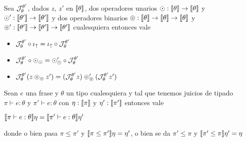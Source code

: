 \begin{proposition}
Sea $\mathcal{J}_{\theta}^{\theta'}$, dados $z$, $z'$ en $\llbracket \theta \rrbracket$, dos operadores
unarios $\odot : \llbracket \theta \rrbracket \rightarrow \llbracket \theta \rrbracket$ y 
$\odot' : \llbracket \theta' \rrbracket \rightarrow \llbracket \theta' \rrbracket$ y dos operadores
binarios $\circledcirc : \llbracket \theta \rrbracket \rightarrow 
		\llbracket \theta \rrbracket \rightarrow \llbracket \theta \rrbracket$ y
$\circledcirc' : \llbracket \theta' \rrbracket \rightarrow 
		\llbracket \theta' \rrbracket \rightarrow \llbracket \theta' \rrbracket$
cualesquiera entonces vale

\begin{itemize}
\item $\mathcal{J}_{\theta}^{\theta'} \circ \iota_{\uparrow} = \iota_{\uparrow} \circ \mathcal{J}_{\theta}^{\theta'}$
\item $\mathcal{J}_{\theta}^{\theta'} \circ \odot_{\odot} = \odot'_{\odot} \circ \mathcal{J}_{\theta}^{\theta'}$
\item $\mathcal{J}_{\theta}^{\theta'} (z \circledcirc_{\circledcirc} z')= 
			(\mathcal{J}_{\theta}^{\theta'} z) \circledcirc'_{\circledcirc} (\mathcal{J}_{\theta}^{\theta'} z')$

\end{itemize}

\end{proposition}

\newpage

\begin{lemma}
Sean $e$ una frase y $\theta$ un tipo cualesquiera y tal que tenemos 
juicios de tipado $\pi \vdash e : \theta$ y $\pi' \vdash e : \theta$
con $\eta : \llbracket \pi \rrbracket$ y $\eta' : \llbracket \pi' \rrbracket$ entonces vale

\begin{center}
$\llbracket \pi \vdash e : \theta \rrbracket\eta = \llbracket \pi' \vdash e : \theta \rrbracket\eta'$
\end{center}

\noindent
donde o bien pasa $\pi \leq \pi'$ y $\llbracket \pi \leq \pi' \rrbracket\eta = \eta'$,
o bien se da $\pi' \leq \pi$ y $\llbracket \pi' \leq \pi \rrbracket\eta' = \eta$

\end{lemma}


